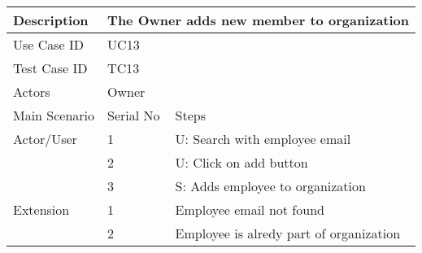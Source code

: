 \begin{table}[]
    \centering
    \begin{tabular}{|l|llll|}
        \hline
        Description   & \multicolumn{4}{l|}{The Owner adds new member to organization}                                                                \\ \hline
        Use Case ID   & \multicolumn{4}{l|}{UC13}                                                                                                     \\ \hline
        Test Case ID  & \multicolumn{4}{l|}{TC13}                                                                                                     \\ \hline
        Actors        & \multicolumn{4}{l|}{Owner}                                                                                                    \\ \hline
        Main Scenario & \multicolumn{1}{l|}{Serial No}                                 & \multicolumn{3}{l|}{Steps}                                   \\ \hline
        Actor/User    & \multicolumn{1}{l|}{1}                                         & \multicolumn{3}{l|}{U: Search with employee email}           \\ \hline
                      & \multicolumn{1}{l|}{2}                                         & \multicolumn{3}{l|}{U: Click on add button}                  \\ \hline
                      & \multicolumn{1}{l|}{3}                                         & \multicolumn{3}{l|}{S: Adds employee to organization}        \\ \hline
        Extension     & \multicolumn{1}{l|}{1}                                         & \multicolumn{3}{l|}{Employee email not found}                \\ \hline
                      & \multicolumn{1}{l|}{2}                                         & \multicolumn{3}{l|}{Employee is alredy part of organization} \\ \hline
    \end{tabular}
\end{table}

